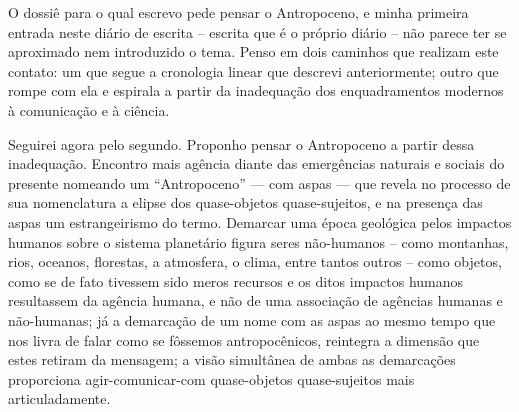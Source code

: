 
O dossiê para o qual escrevo pede pensar o Antropoceno, e minha primeira entrada neste diário de escrita -- escrita que é o próprio diário -- não parece ter se aproximado nem introduzido o tema. Penso em dois caminhos que realizam este contato: um que  segue a cronologia linear que descrevi anteriormente; outro que rompe com ela e espirala a partir da inadequação dos enquadramentos modernos à comunicação e à ciência.

Seguirei agora pelo segundo. Proponho pensar o Antropoceno a partir dessa inadequação. Encontro mais agência diante das emergências naturais e sociais do presente nomeando um \enquote{Antropoceno} --- com aspas --- que revela no processo  de sua nomenclatura a elipse dos quase-objetos quase-sujeitos, e na presença das aspas um estrangeirismo do termo. Demarcar uma época geológica pelos  impactos humanos sobre o sistema planetário figura seres não-humanos -- como montanhas, rios, oceanos, florestas, a atmosfera, o clima, entre tantos outros -- como objetos, como se de fato tivessem sido meros recursos e os ditos impactos humanos resultassem da agência humana, e não de uma associação de agências humanas e não-humanas; já a demarcação de um nome com as aspas ao mesmo tempo que nos livra de falar como se fôssemos antropocênicos, reintegra a dimensão que estes retiram da mensagem; a visão simultânea de ambas as demarcações proporciona agir-comunicar-com quase-objetos quase-sujeitos  mais articuladamente.

